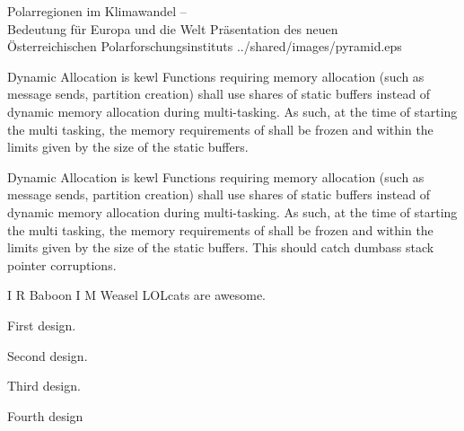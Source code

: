 






\uvietitlepage%
{Polarregionen im Klimawandel --\\Bedeutung für Europa und die Welt}%
{Präsentation des neuen\\Österreichischen Polarforschungsinstituts}%
{../shared/images/pyramid.eps}



 {Dynamic Allocation is kewl}{%
Functions requiring memory allocation (such as message sends, partition creation) shall %
use shares of static buffers instead of dynamic memory allocation during multi-tasking.%
As such, at the time of starting the multi tasking, the memory requirements of %
shall be frozen and within the limits given by the size of the static buffers.
}{}%

 {Dynamic Allocation is kewl}{%
Functions requiring memory allocation (such as message sends, partition creation) shall %
use shares of static buffers instead of dynamic memory allocation during multi-tasking.%
As such, at the time of starting the multi tasking, the memory requirements of %
shall be frozen and within the limits given by the size of the static buffers.
}{%
This should catch dumbass stack pointer corruptions.
}%

 {I R Baboon}{%
	I M Weasel
}{%
LOLcats are awesome.
}%


\begin{description}
  \item{} First design. 
  \item{} Second design. 
  \begin{description}
    \item{} Third design. 
    \item{} Fourth design
  \end{description}
\end{description}


\traceabilitymatrix



